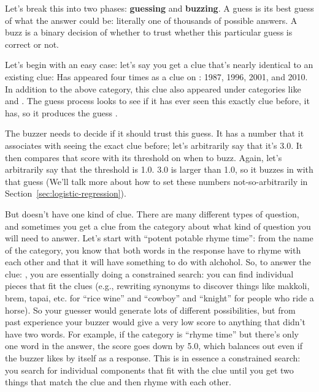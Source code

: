 Let's break this into two phases: {\bf guessing} and {\bf buzzing}.
%
A guess is its best guess of what the answer could be: literally one of
thousands of possible answers.
%
A buzz is a binary decision of whether to trust whether this particular guess
is correct or not.

Let's begin with an easy case: let's say you get a clue that's nearly
identical to an existing clue:
Has appeared four times as a clue on \jeopardy{}: 1987, 1996, 2001, and 2010.
%
In addition to the above category, this clue also appeared under categories like  and .
%
The guess process looks to see if it has ever seen this exactly clue before,
it has, so it produces the guess .

The buzzer needs to decide if it should trust this guess.
%
It has a number that it associates with seeing the exact clue before; let's
arbitrarily say that it's 3.0.  It then compares that score with its threshold
on when to buzz.  Again, let's arbitrarily say that the threshold is 1.0.  3.0
is larger than 1.0, so it buzzes in with that guess (We'll talk more about how to set these numbers not-so-arbitrarily in
Section~\ref{sec:logistic-regression}).

But \jeopardy{} doesn’t have one kind of clue.  There are many different types
of question, and sometimes you get a clue from the category about what kind of
question you will need to answer.  Let’s start with ``potent potable rhyme
time'': from the name of the category, you know that both words in the
response have to rhyme with each other and that it will have something to do
with alchohol.
%
So, to answer the clue:
,
%
you are essentially doing a constrained search: you can find individual pieces
that fit the clues (e.g., rewriting synonyms to discover things like makkoli,
brem, tapai, etc. for ``rice wine'' and ``cowboy'' and ``knight'' for people
who ride a horse).
%
So your guesser would generate lots of different possibilities, but from past
experience your buzzer would give a very low score to anything that didn't
have two words.
%
For example, if the category is ``rhyme time'' but there's only one word in
the answer, the score goes down by 5.0, which balances out even if the buzzer
likes  by itself as a response.
%
This is in essence a
constrained search: you search for individual components that fit with the
clue until you get two things that match the clue and then rhyme with each
other.

